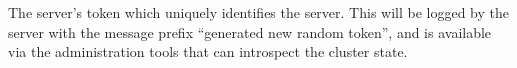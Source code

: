 The server's token which uniquely identifies the server.  This will be logged by
the server with the message prefix ``generated new random token'', and is
available via the administration tools that can introspect the cluster state.
